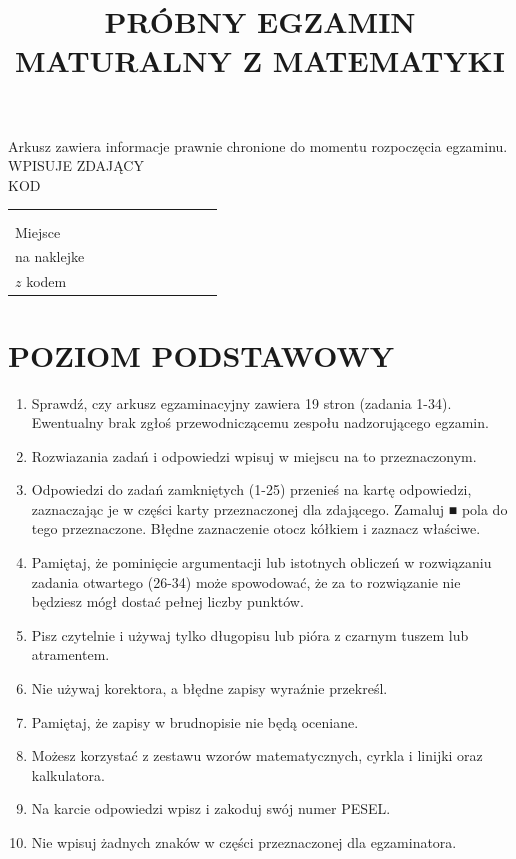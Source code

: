 \documentclass[10pt]{article}
\title{PRÓBNY EGZAMIN MATURALNY Z MATEMATYKI }
\author{}
\date{}
\begin{document}
\maketitle
Arkusz zawiera informacje prawnie chronione do momentu rozpoczęcia egzaminu.\\
WPISUJE ZDAJĄCY\\
KOD

\begin{center}
\begin{tabular}{|l|l|l|l|l|l|l|l|l|l|}
 &  &  &  &  &  &  &  &  \\
\hline
 &  &  &  &  &  &  &  &  \\
\hline
 &  &  &  &  &  &  &  &  \\
Miejsce &  &  &  &  &  &  &  &  \\
na naklejke &  &  &  &  &  &  &  &  \\
\(z\) kodem &  &  &  &  &  &  &  &  \\
\end{tabular}
\end{center}

\section*{POZIOM PODSTAWOWY}
\begin{enumerate}
  \item Sprawdź, czy arkusz egzaminacyjny zawiera 19 stron (zadania 1-34). Ewentualny brak zgłoś przewodniczącemu zespołu nadzorującego egzamin.
  \item Rozwiazania zadań i odpowiedzi wpisuj w miejscu na to przeznaczonym.
  \item Odpowiedzi do zadań zamkniętych (1-25) przenieś na kartę odpowiedzi, zaznaczając je w części karty przeznaczonej dla zdającego. Zamaluj ■ pola do tego przeznaczone. Błędne zaznaczenie otocz kółkiem i zaznacz właściwe.
  \item Pamiętaj, że pominięcie argumentacji lub istotnych obliczeń w rozwiązaniu zadania otwartego (26-34) może spowodować, że za to rozwiązanie nie będziesz mógł dostać pełnej liczby punktów.
  \item Pisz czytelnie i używaj tylko długopisu lub pióra z czarnym tuszem lub atramentem.
  \item Nie używaj korektora, a błędne zapisy wyraźnie przekreśl.
  \item Pamiętaj, że zapisy w brudnopisie nie będą oceniane.
  \item Możesz korzystać z zestawu wzorów matematycznych, cyrkla i linijki oraz kalkulatora.
  \item Na karcie odpowiedzi wpisz i zakoduj swój numer PESEL.
  \item Nie wpisuj żadnych znaków w części przeznaczonej dla egzaminatora.
\end{enumerate}
\end{document}
